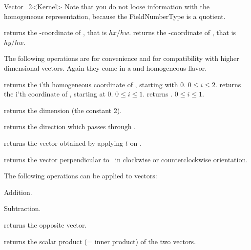 \begin{ccRefClass} {Vector_2<Kernel>}
Note that you do not loose information with the homogeneous
representation, because the FieldNumberType is a quotient.

       {returns the -coordinate of \ccVar, that is $hx/hw$.}
\ccGlue
{}
       {returns the -coordinate of \ccVar, that is $hy/hw$.}
       
The following operations are for convenience and for compatibility
with higher dimensional vectors.  Again they come in a
 and homogeneous flavor.

       {returns the i'th homogeneous coordinate of \ccVar, starting with 0.
        \ccPrecond $0\leq i \leq 2$.}
\ccGlue
{}
       {returns the i'th  coordinate of \ccVar, starting at 0.
        \ccPrecond $0\leq i \leq 1$.}
\ccGlue
{}
       {returns  .
        \ccPrecond $0\leq i \leq 1$.}

       {returns the dimension (the constant 2).}

       {returns the direction which passes through \ccVar.}

       {returns the vector obtained by applying $t$ on \ccVar.}

       {returns the vector perpendicular to \ccVar\ in clockwise or
        counterclockwise orientation.}


The following operations can be applied to vectors:

       {Addition.}

       {Subtraction.}

       {returns the opposite vector.}

       {returns the scalar product (= inner product) of the two vectors.}



\end{ccRefClass}

